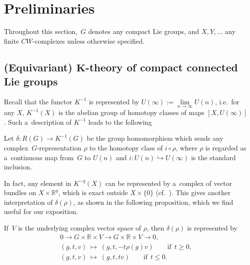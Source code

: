 \section{Preliminaries}\label{Section2}

Throughout this section,~$G$ denotes any compact Lie groups, and $X, Y, \dots$ any f\/inite $CW$-complexes unless
otherwise specif\/ied.

\vspace{-1mm}

\subsection[(Equivariant) $K$-theory of compact connected Lie groups]{(Equivariant)
$\boldsymbol{K}$-theory of compact connected Lie groups}

Recall that the functor $K^{-1}$ is represented by $U(\infty):=\lim\limits_{n\to\infty}U(n)$, i.e.\
for any $X$, $K^{-1}(X)$ is the abelian group of homotopy classes of maps $[X, U(\infty)]$.
Such a~description of $K^{-1}$ leads to the following
\begin{Definition}
\label{betamap}
Let $\delta: R(G)\to K^{-1}(G)$ be the group homomorphism which sends any complex~$G$-representation $\rho$ to the
homotopy class of $i\circ \rho$, where $\rho$ is regarded as a~continuous map from~$G$ to $U(n)$ and $i:
U(n)\hookrightarrow U(\infty)$ is the standard inclusion.
\end{Definition}

{\samepage In fact, any element in $K^{-q}(X)$ can be represented by a~complex of vector bundles on $X\times \mathbb{R}^q$, which
is exact outside $X\times\{0\}$ (cf.~\cite{At}).
This gives another interpretation of $\delta(\rho)$, as shown in the following proposition,
which we f\/ind useful for our
exposition.}

\begin{Proposition}
\label{-1_class}
If~$V$ is the underlying complex vector space of $\rho$, then $\delta(\rho)$ is represented by
\begin{gather*}
0\to G\times\mathbb{R}\times V \to G\times\mathbb{R}\times V\to 0,
\\
(g, t, v) \ \mapsto\  (g, t, -t\rho(g)v) \qquad\text{if} \ \ t\geq 0,
\\
(g, t, v) \ \mapsto\  (g, t, tv) \qquad\text{if}\ \  t\leq 0.
\end{gather*}
\end{Proposition}


